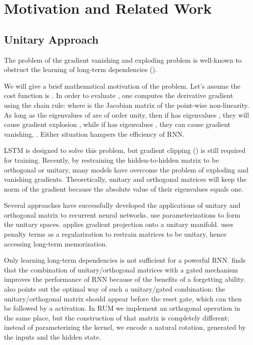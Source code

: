 \documentclass{article} \usepackage{iclr2018_conference,times}
\begin{document}
\section{Motivation and Related Work}

\subsection{Unitary Approach}
The problem of the gradient vanishing and exploding problem is well-known to obstruct the learning of long-term dependencies (\cite{bengio1994learning}).







We will give a brief mathematical motivation of the problem. Let's assume the cost function is . In order to evaluate , one computes the derivative gradient using the chain rule:  where  is the Jacobian matrix of the point-wise non-linearity. As long as the eigenvalues of  are of order unity, then if  has eigenvalues , they will cause gradient explosion  , while if  has eigenvalues , they can cause gradient vanishing, . Either situation hampers the efficiency of RNN.




LSTM is designed to solve this problem, but gradient clipping (\cite{Pascanu2012on}) is still required for training. Recently, by restraining the hidden-to-hidden matrix to be orthogonal or unitary, many models have overcome the problem of exploding and vanishing gradients. Theoretically, unitary and orthogonal matrices will keep the norm of the gradient because the absolute value of their eigenvalues equals one. 



Several approaches have successfully developed the applications of unitary and orthogonal matrix to recurrent neural networks. \cite{arjovsky2015unitary, jing2016tunable} use parameterizations to form the unitary spaces. \cite{wisdom2016full} applies gradient projection onto a unitary manifold. \cite{Eugene2017on} uses penalty terms as a regularization to restrain matrices to be unitary, hence accessing long-term memorization.

Only learning long-term dependencies is not sufficient for a powerful RNN. \cite{jing2017gated} finds that the combination of unitary/orthogonal matrices with a gated mechanism improves the performance of RNN because of the benefits of a forgetting ability. \cite{jing2017gated} also points out the optimal way of such a unitary/gated combination: the unitary/orthogonal matrix should appear before the reset gate, which can then be followed by a  activation. In RUM we implement an orthogonal operation in the same place, but the construction of that matrix is completely different: instead of parameterizing the kernel, we encode a natural rotation, generated by the inputs and the hidden state. 
\end{document}
